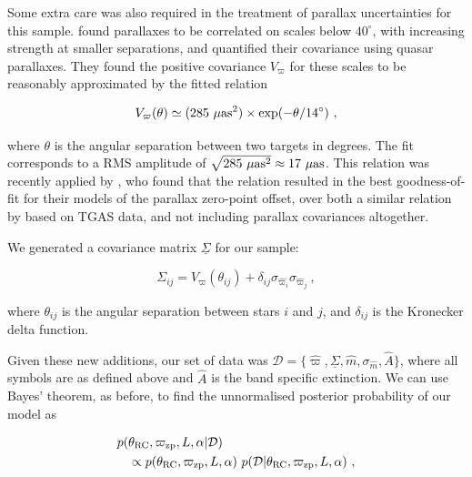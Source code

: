 \documentclass[fleqn,usenatbib]{mnras}
\begin{document}
Some extra care was also required in the treatment of parallax uncertainties for this sample. \cite{art:lindegren+2018} found parallaxes to be correlated on scales below $40^\circ$, with increasing strength at smaller separations, and quantified their covariance using quasar parallaxes. They found the positive covariance $V_\varpi$ for these scales to be reasonably approximated by the fitted relation

\begin{equation}\label{eq:covariance}
V_\varpi(\theta) \simeq (285\ \mu \rm as^2) \times \exp(-\theta/14^\circ)\ ,
\end{equation}

\noindent where $\theta$ is the angular separation between two targets in degrees. The fit corresponds to a RMS amplitude of $\sqrt{285\ \mu \rm as^2} \approx 17\ \mu\rm as$. This relation was recently applied by \cite{art:zinn+2018}, who found that the \cite{art:lindegren+2018} relation resulted in the best goodness-of-fit for their models of the parallax zero-point offset, over both a similar relation by \cite{art:zinn+2017} based on TGAS data, and not including parallax covariances altogether.

We generated a covariance matrix $\underline{\Sigma}$ for our sample:

\begin{equation}\label{eq:covar}
\Sigma_{ij} = V_\varpi(\theta_{ij}) + \delta_{ij}\sigma_{\hat{\varpi}_i}\sigma_{\hat{\varpi}_j}\ ,
\end{equation}

\noindent where $\theta_{ij}$ is the angular separation between stars $i$ and $j$, and $\delta_{ij}$ is the Kronecker delta function. 

Given these new additions, our set of data was $\mathcal{D} = \{\hat{\varpi}, \underline{\Sigma}, \hat{m}, \sigma_{\hat{m}}, \hat{A} \}$, where all symbols are as defined above and $\hat{A}$ is the band specific extinction. We can use Bayes' theorem, as before, to find the unnormalised posterior probability of our model as

\begin{equation}
\begin{split}
p(&\theta_{\rm RC}, \varpi_{\rm zp}, L, \alpha | \mathcal{D}) \\
&\propto  p(\theta_{\rm RC}, \varpi_{\rm zp}, L, \alpha)\ p(\mathcal{D} | \theta_{\rm{RC}}, \varpi_{\rm{zp}}, L, \alpha)\ ,
\end{split}
\end{equation}
\end{document}
